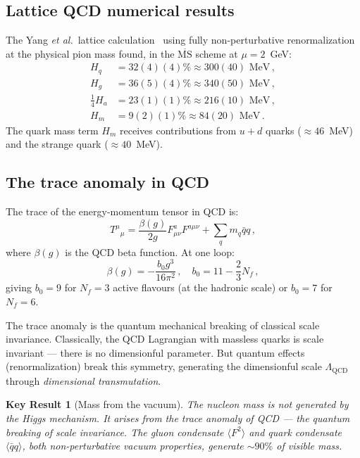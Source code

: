 \documentclass[aps,prd,twocolumn,superscriptaddress,floatfix,nofootinbib]{revtex4-2}
\newcommand{\LQCD}{\Lambda_{\mathrm{QCD}}}
\newtheorem{result}{Key Result}
\begin{document}
\subsection{Lattice QCD numerical results}

The Yang \emph{et al.}\ lattice calculation~\cite{Yang2018} using fully
non-perturbative renormalization at the physical pion mass found, in the
$\overline{\mathrm{MS}}$ scheme at $\mu = 2$~GeV:
\begin{align}
H_q &= 32(4)(4)\% \approx 300(40) \text{ MeV} \, , \label{eq:Hq} \\
H_g &= 36(5)(4)\% \approx 340(50) \text{ MeV} \, , \label{eq:Hg} \\
\tfrac{1}{4}H_a &= 23(1)(1)\% \approx 216(10) \text{ MeV} \, , \label{eq:Ha} \\
H_m &= 9(2)(1)\% \approx 84(20) \text{ MeV} \, . \label{eq:Hm}
\end{align}
The quark mass term $H_m$ receives contributions from $u+d$ quarks
($\approx 46$~MeV) and the strange quark ($\approx 40$~MeV).

\subsection{The trace anomaly in QCD}

The trace of the energy-momentum tensor in QCD is:
\begin{equation}
T^\mu{}_\mu = \frac{\beta(g)}{2g} F^a_{\mu\nu} F^{a\mu\nu} + \sum_q m_q
\bar{q} q \, ,
\label{eq:trace_anomaly}
\end{equation}
where $\beta(g)$ is the QCD beta function. At one loop:
\begin{equation}
\beta(g) = -\frac{b_0 g^3}{16\pi^2} \, , \quad b_0 = 11 - \frac{2}{3}N_f \, ,
\end{equation}
giving $b_0 = 9$ for $N_f = 3$ active flavours (at the hadronic scale) or $b_0
= 7$ for $N_f = 6$.

The trace anomaly is the quantum mechanical breaking of classical scale
invariance. Classically, the QCD Lagrangian with massless quarks is scale
invariant --- there is no dimensionful parameter. But quantum effects
(renormalization) break this symmetry, generating the dimensionful scale $\LQCD$
through \emph{dimensional transmutation}.

\begin{result}[Mass from the vacuum]
The nucleon mass is \emph{not} generated by the Higgs mechanism. It arises from
the trace anomaly of QCD --- the quantum breaking of scale invariance. The gluon
condensate $\langle F^2 \rangle$ and quark condensate $\langle \bar{q}q
\rangle$, both non-perturbative vacuum properties, generate $\sim 90\%$ of
visible mass.
\end{result}
\end{document}
